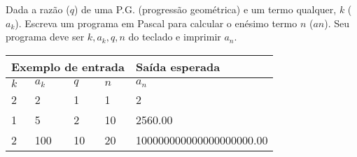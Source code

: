 \item Dada a razão ($q$) de uma P.G. (progressão geométrica) e um termo 
qualquer, $k$ ($a_k$). Escreva um programa em Pascal para calcular o enésimo 
termo $n$ ($an$). Seu programa deve ser $k, a_k, q, n$ do teclado e imprimir
$a_n$.

\begin{center}
\begin{tabular}{|l|l|l|l|l|} \hline
\multicolumn{4}{|c|}{Exemplo de entrada} & Saída esperada \\ \hline
$k$ & $a_k$ & $q$ & $n$  & $a_n$               \\ \hline
2 & 2 & 1 & 1        & 2                \\ \hline
1 & 5 & 2 & 10       & 2560.00             \\ \hline
2 & 100 & 10 & 20    & 100000000000000000000.00               \\ \hline
\end{tabular}
\end{center}